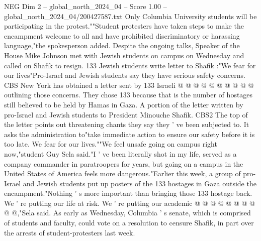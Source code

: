 \begin{textsample}{NEG Dim 2 – global\_north\_2024\_04 – Score 1.00 – global\_north\_2024\_04/200427587.txt}
Only Columbia University students will be participating in the protest.""Student protesters have taken steps to make the encampment welcome to all and have prohibited discriminatory or harassing language,"the spokesperson added.
Despite the ongoing talks, Speaker of the House Mike Johnson met with Jewish students on campus on Wednesday and called on Shafik to resign. 133 Jewish students write letter to Shafik :"We fear for our lives"Pro-Israel and Jewish students say they have serious safety concerns.
CBS New York has obtained a letter sent by 133 Israeli @ @ @ @ @ @ @ @ @ @ outlining those concerns.
They chose 133 because that is the number of hostages still believed to be held by Hamas in Gaza.
A portion of the letter written by pro-Israel and Jewish students to President Minouche Shafik.
CBS2 The top of the letter points out threatening chants they say they ' ve been subjected to.
It asks the administration to"take immediate action to ensure our safety before it is too late.
We fear for our lives.""We feel unsafe going on campus right now,"student Guy Sela said."I ' ve been literally shot in my life, served as a company commander in paratroopers for years, but going on a campus in the United States of America feels more dangerous."Earlier this week, a group of pro-Israel and Jewish students put up posters of the 133 hostages in Gaza outside the encampment."Nothing ' s more important than bringing those 133 hostage back.
We ' re putting our life at risk.
We ' re putting our academic @ @ @ @ @ @ @ @ @ @,"Sela said.
As early as Wednesday, Columbia ' s senate, which is comprised of students and faculty, could vote on a resolution to censure Shafik, in part over the arrests of student-protesters last week.

\end{textsample}
